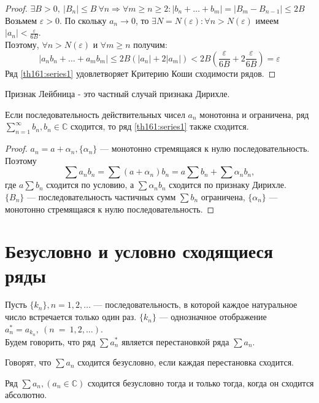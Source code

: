 \begin{proof}
  $\exists B > 0, \ |B_n| \leq B \ \forall n \Rightarrow \forall m \geq n \geq 2:
  |b_n + \dots + b_m| = |B_m - B_{n - 1}| \leq 2B$ \\
  Возьмем $\varepsilon > 0$. По скольку $a_n \to 0$, то
  $\exists N = N(\varepsilon): \forall n > N(\varepsilon)$ имеем
  $|a_n| < \frac{\varepsilon}{6B}$.\\
  Поэтому, $\forall n > N(\varepsilon)$ и $\forall m \geq n$ получим:
  $$|a_n b_n + \dots + a_m b_m| \leq 2B(|a_n| + 2|a_m|) <
  2B\left(\frac{\varepsilon}{6B} + 2 \frac{\varepsilon}{6B} \right) = \varepsilon$$
  Ряд \eqref{th161:series1} удовлетворяет Критерию Коши сходимости рядов.
\end{proof}
\begin{remark}
  Признак Лейбница - это частный случай признака Дирихле. \\
\end{remark}

\begin{theorem}
  \label{th162}
  Если последовательность действительных чисел $a_n$ монотонна и ограничена,
  ряд $\sum\limits_{n = 1}^{\infty} b_n, b_n \in \mathbb{C}$ сходится, то ряд
  \eqref{th161:series1} также сходится.
\end{theorem}

\begin{proof}
  $a_n = a + \alpha_n, \{\alpha_n\}$ --- монотонно стремящаяся к нулю
  последовательность. \\
  Поэтому
  $$\sum a_n b_n = \sum (a + \alpha_n)b_n = a \sum b_n + \sum \alpha_n b_n, $$
  где $a \sum b_n$ сходится по условию, а $\sum \alpha_n b_n$ сходится по
  признаку Дирихле. \\
  $\{B_n\}$ --- последовательность частичных сумм $\sum b_n$ ограничена,
  $\{\alpha_n\}$ --- монотонно стремящаяся к нулю последовательность.
\end{proof}

\section{Безусловно и условно сходящиеся ряды}
\begin{definition}
  Пусть $\{k_n\}, n = 1, 2, \dots$ --- последовательность, в которой каждое
  натуральное число встречается только один раз. $\{k_n\}$ --- однозначное
  отображение $a_n^* = a_{k_n}, \ (n~=~1, 2, \dots)$. \\
  Будем говорить, что ряд $\sum a_n^*$ является перестановкой ряда $\sum a_n$.
\end{definition}
\begin{definition}
  Говорят, что $\sum a_n$ сходится безусловно, если каждая перестановка
  сходится.
\end{definition}
\begin{theorem}
  \label{th171}
  Ряд $\sum a_n, (a_n \in \mathbb{C})$ сходится безусловно тогда и только тогда,
  когда он сходится абсолютно.
\end{theorem}

